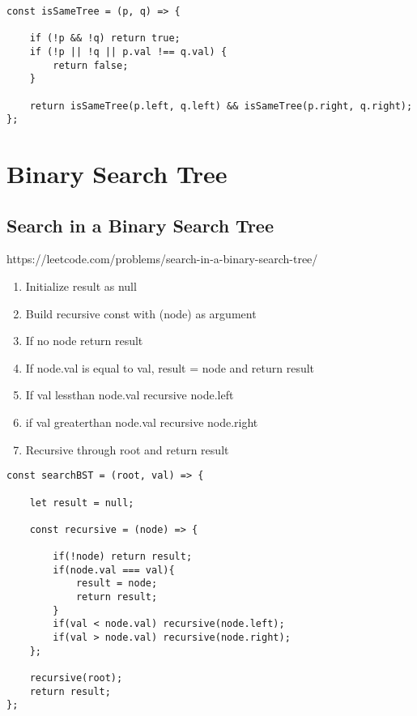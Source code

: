 \documentclass[10pt]{article}
\begin{document}
\begin{lstlisting}[title=Solution isSameTree, captionpos=t]
const isSameTree = (p, q) => {

    if (!p && !q) return true;
    if (!p || !q || p.val !== q.val) {
        return false;    
    }

    return isSameTree(p.left, q.left) && isSameTree(p.right, q.right);
};
\end{lstlisting}

\medskip %














\pagebreak
\section{Binary Search Tree}








\medskip   
\subsection {Search in a Binary Search Tree}
https://leetcode.com/problems/search-in-a-binary-search-tree/

\begin{enumerate}
	\item Initialize result as null 
	\item Build recursive const with (node) as argument
	\item If no node return result 
	\item If node.val is equal to val, result = node and return result
	\item If val lessthan node.val recursive node.left
	\item if val greaterthan node.val recursive node.right
	\item Recursive through root and return result
\end{enumerate}

\begin{lstlisting}[title=Solution searchBST, captionpos=t]
const searchBST = (root, val) => {
    
    let result = null; 
    
    const recursive = (node) => {
        
        if(!node) return result; 
        if(node.val === val){
            result = node;
            return result;
        }
        if(val < node.val) recursive(node.left);
        if(val > node.val) recursive(node.right);
    };

    recursive(root);
    return result;
};
\end{lstlisting}
\end{document}
